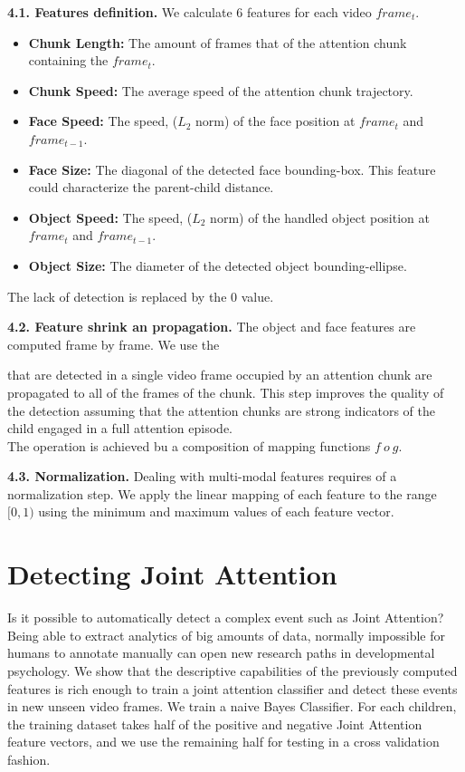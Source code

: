 \documentclass[10pt,letterpaper]{article}
\begin{document}
{\bf 4.1. Features definition.} We calculate 6 features for each video $frame_{t}$. 
\begin {itemize}
\item {\bf Chunk Length:} The amount of frames that of the attention chunk containing the $frame_{t}$.
\vspace {-0.2cm}
\item {\bf Chunk Speed:} The average speed of the attention chunk trajectory. 
\vspace {-0.2cm}
\item {\bf Face Speed:} The speed, ($L_{2}$ norm) of the face position at $frame_{t}$ and $frame_{t-1}$.    
\vspace {-0.2cm}
\item {\bf Face Size:} The diagonal of the detected face bounding-box. This feature could characterize the parent-child distance.   
\vspace {-0.2cm}
\item {\bf Object Speed:} The speed, ($L_{2}$ norm) of the handled object position at $frame_{t}$ and $frame_{t-1}$.    
\vspace {-0.2cm}
\item {\bf Object Size:} The diameter of the detected object bounding-ellipse.
\end{itemize}
The lack of detection is replaced by the 0 value. 

{\bf 4.2. Feature shrink an propagation.} The object and face features are computed frame by frame. We use the 

 that are detected in a single video frame occupied by an attention chunk are propagated to all of the frames of the chunk. This step improves the quality of the detection assuming that the attention chunks are strong indicators of the child engaged in a full attention episode.\\ The operation is achieved bu a composition of mapping functions $f ~o~ g$. 


{\bf 4.3. Normalization.} Dealing with multi-modal features requires of a normalization step. We apply the linear mapping of each feature to the range $[0,1)$ using the minimum and maximum values of each feature vector.\\

\section{Detecting Joint Attention}
Is it possible to automatically detect a complex event such as Joint Attention? Being able to extract analytics of big amounts of data, normally impossible for humans to annotate manually can open new research paths in developmental psychology. We show that the descriptive capabilities of the previously computed features is rich enough to train a joint attention classifier and detect these events in new unseen video frames. We train a naive Bayes Classifier. For each children, the training dataset takes half of the positive and negative Joint Attention feature vectors, and we use the remaining half for testing in a cross validation fashion. 
 
\end{document}
